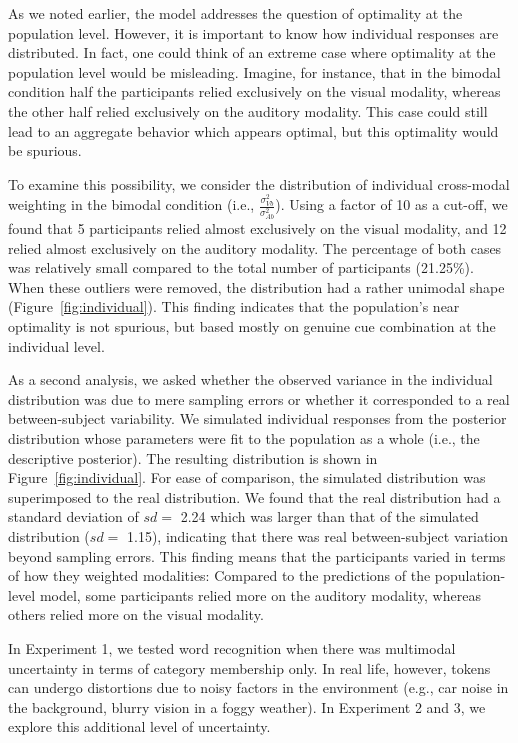 \documentclass[english,floatsintext,man]{apa6}
\theoremstyle{definition}
\theoremstyle{definition}
\theoremstyle{definition}
\theoremstyle{remark}
\begin{document}
As we noted earlier, the model addresses the question of optimality at
the population level. However, it is important to know how individual
responses are distributed. In fact, one could think of an extreme case
where optimality at the population level would be misleading. Imagine,
for instance, that in the bimodal condition half the participants relied
exclusively on the visual modality, whereas the other half relied
exclusively on the auditory modality. This case could still lead to an
aggregate behavior which appears optimal, but this optimality would be
spurious.

To examine this possibility, we consider the distribution of individual
cross-modal weighting in the bimodal condition (i.e.,
\(\frac{\sigma^2_{Vb}}{\sigma^2_{Ab}}\)). Using a factor of 10 as a
cut-off, we found that 5 participants relied almost exclusively on the
visual modality, and 12 relied almost exclusively on the auditory
modality. The percentage of both cases was relatively small compared to
the total number of participants (21.25\%). When these outliers were
removed, the distribution had a rather unimodal shape
(Figure~\ref{fig:individual}). This finding indicates that the
population's near optimality is not spurious, but based mostly on
genuine cue combination at the individual level.

As a second analysis, we asked whether the observed variance in the
individual distribution was due to mere sampling errors or whether it
corresponded to a real between-subject variability. We simulated
individual responses from the posterior distribution whose parameters
were fit to the population as a whole (i.e., the descriptive posterior).
The resulting distribution is shown in Figure~\ref{fig:individual}. For
ease of comparison, the simulated distribution was superimposed to the
real distribution. We found that the real distribution had a standard
deviation of \(sd=\) 2.24 which was larger than that of the simulated
distribution (\(sd=\) 1.15), indicating that there was real
between-subject variation beyond sampling errors. This finding means
that the participants varied in terms of how they weighted modalities:
Compared to the predictions of the population-level model, some
participants relied more on the auditory modality, whereas others relied
more on the visual modality.

In Experiment 1, we tested word recognition when there was multimodal
uncertainty in terms of category membership only. In real life, however,
tokens can undergo distortions due to noisy factors in the environment
(e.g., car noise in the background, blurry vision in a foggy weather).
In Experiment 2 and 3, we explore this additional level of uncertainty.
\end{document}
